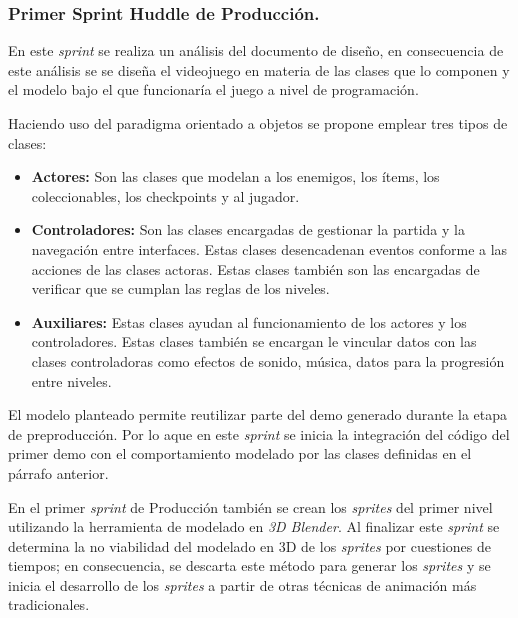 \subsubsection{Primer Sprint Huddle de Producción.}
En este \textit{sprint} se realiza un análisis del documento de diseño, en consecuencia 
de este análisis se se diseña el videojuego en materia de las clases que lo 
componen y el modelo bajo el que funcionaría el juego a nivel de programación. 
\\
\par
Haciendo uso del paradigma orientado a objetos se propone emplear tres tipos 
de clases:
\begin{itemize}
        \item \textbf{Actores:} Son las clases que modelan a los enemigos, los ítems, 
        los coleccionables, los checkpoints y al jugador.
        \item \textbf{Controladores:} Son las clases encargadas de gestionar la partida 
        y la navegación entre interfaces. Estas clases desencadenan eventos conforme a 
        las acciones de las clases actoras. Estas clases también son las encargadas de 
        verificar que se cumplan las reglas de los niveles.
        \item \textbf{Auxiliares:} Estas clases ayudan al funcionamiento de los actores 
        y los controladores. Estas clases también se encargan le vincular datos con 
        las clases controladoras como efectos de sonido, música, datos para la 
        progresión entre niveles.
\end{itemize}
El modelo planteado permite reutilizar parte del demo generado durante la etapa 
de preproducción. Por lo aque en este \textit{sprint} se inicia la integración 
del código del primer demo con el comportamiento modelado por las clases definidas 
en el párrafo anterior. 
\\
\par
En el primer \textit{sprint} de Producción también se crean los \textit{sprites} del 
primer nivel utilizando la herramienta de modelado en \textit{3D Blender}. Al 
finalizar este \textit{sprint} se determina la no viabilidad del modelado en 3D de los 
\textit{sprites} por cuestiones de tiempos; en consecuencia, se descarta este 
método para generar los \textit{sprites} y se inicia el desarrollo de los 
\textit{sprites} a partir de otras técnicas de animación más tradicionales.


